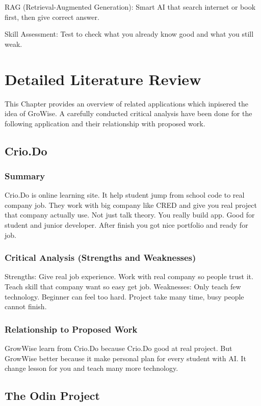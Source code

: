 \documentclass{FastFyp}
\begin{document}
RAG (Retrieval-Augmented Generation): Smart AI that search internet or book first, then give correct answer.

Skill Assessment: Test to check what you already know good and what you still weak.


\section{Detailed Literature Review}
This Chapter provides an overview of related applications which inpisered the idea of GroWise. A carefully conducted critical analysis have been done for the following application and their relationship with proposed work.




\subsection{Crio.Do}

\subsubsection{Summary}
Crio.Do \cite{ref:CrioDo:2025} is online learning site. It help student jump from school code to real company job. They work with big company like CRED and give you real project that company actually use. Not just talk theory. You really build app. Good for student and junior developer. After finish you got nice portfolio and ready for job.

\subsubsection{Critical Analysis (Strengths and Weaknesses)}
Strengths: Give real job experience. Work with real company so people trust it. Teach skill that company want so easy get job.  
Weaknesses: Only teach few technology. Beginner can feel too hard. Project take many time, busy people cannot finish.

\subsubsection{Relationship to Proposed Work}
GrowWise learn from Crio.Do because Crio.Do good at real project. But GrowWise better because it make personal plan for every student with AI. It change lesson for you and teach many more technology.


\subsection{The Odin Project}
\end{document}
